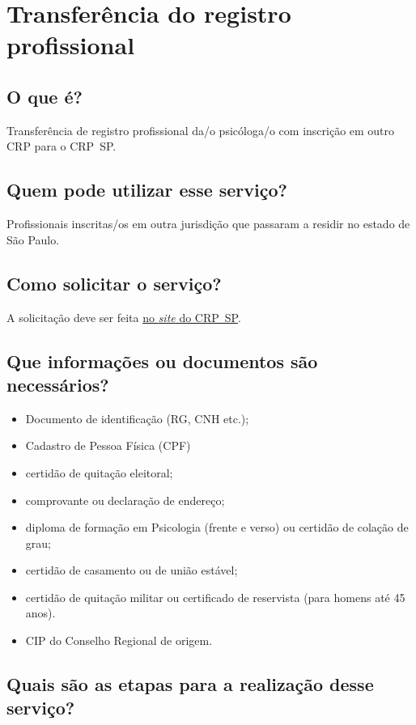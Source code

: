 \chapter{Transferência do registro profissional}
\label{chap:pf-transferencia}

\section{O que é?}

Transferência de registro profissional da/o psicóloga/o com inscrição em outro CRP para o CRP~SP.

\section{Quem pode utilizar esse serviço?}

Profissionais inscritas/os em outra jurisdição que passaram a residir no estado de São Paulo.

\section{Como solicitar o serviço?}

A solicitação deve ser feita \href{https://www.crpsp.org/pagina/view/337}{no \emph{site} do CRP~SP}.

\section{Que informações ou documentos são necessários?}

\begin{itemize}
	\item
	Documento de identificação (RG, CNH etc.);
	\item
	Cadastro de Pessoa Física (CPF)
	\item
	certidão de quitação eleitoral;
	\item
	comprovante ou declaração de endereço;
	\item
	diploma de formação em Psicologia (frente e verso) ou certidão de colação de grau;
	\item
	certidão de casamento ou de união estável;
	\item
	certidão de quitação militar ou certificado de reservista (para homens até 45 anos).
	\item
	CIP do Conselho Regional de origem.
\end{itemize}

\section{Quais são as etapas para a realização desse serviço?}

